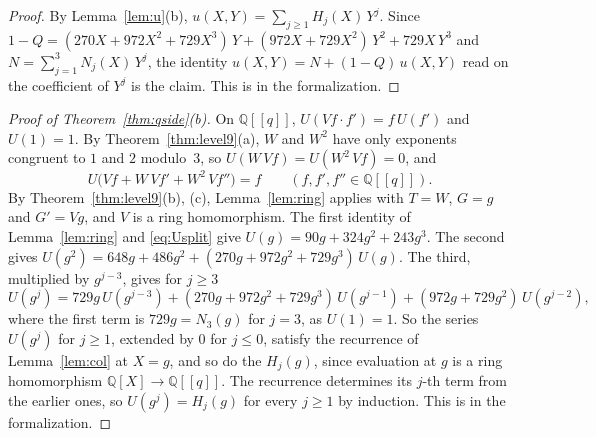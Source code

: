 \documentclass[11pt]{amsart}
\theoremstyle{definition}
\numberwithin{equation}{section}
\newcommand{\Q}{\mathbb{Q}}
\begin{document}
\begin{proof}
By Lemma~\ref{lem:u}(b), $u(X,Y)=\sum_{j\ge1}H_j(X)\,Y^j$. Since $1-Q=(270X+972X^2+729X^3)\,Y+(972X+729X^2)\,Y^2+729X\,Y^3$ and $N=\sum_{j=1}^3N_j(X)\,Y^j$, the identity $u(X,Y)=N+(1-Q)\,u(X,Y)$ read on the coefficient of $Y^j$ is the claim. This is  in the formalization.
\end{proof}

\begin{proof}[Proof of Theorem~\textup{\ref{thm:qside}(b)}]
On $\Q[[q]]$, $U(Vf\cdot f')=f\,U(f')$ and $U(1)=1$. By Theorem~\ref{thm:level9}(a), $W$ and $W^2$ have only exponents congruent to $1$ and $2$ modulo~$3$, so $U(W\,Vf)=U(W^2\,Vf)=0$, and
\begin{equation}\label{eq:Usplit}
U\bigl(Vf+W\,Vf'+W^2\,Vf''\bigr)=f\qquad(f,f',f''\in\Q[[q]]).
\end{equation}
By Theorem~\ref{thm:level9}(b), (c), Lemma~\ref{lem:ring} applies with $T=W$, $G=g$ and $G'=Vg$, and $V$ is a ring homomorphism. The first identity of Lemma~\ref{lem:ring} and \eqref{eq:Usplit} give $U(g)=90g+324g^2+243g^3$. The second gives $U(g^2)=648g+486g^2+(270g+972g^2+729g^3)\,U(g)$. The third, multiplied by $g^{j-3}$, gives for $j\ge3$
\[
U(g^j)=729g\,U(g^{j-3})+(270g+972g^2+729g^3)\,U(g^{j-1})+(972g+729g^2)\,U(g^{j-2}),
\]
where the first term is $729g=N_3(g)$ for $j=3$, as $U(1)=1$. So the series $U(g^j)$ for $j\ge1$, extended by $0$ for $j\le0$, satisfy the recurrence of Lemma~\ref{lem:col} at $X=g$, and so do the $H_j(g)$, since evaluation at $g$ is a ring homomorphism $\Q[X]\to\Q[[q]]$. The recurrence determines its $j$-th term from the earlier ones, so $U(g^j)=H_j(g)$ for every $j\ge1$ by induction. This is  in the formalization.
\end{proof}
\end{document}
